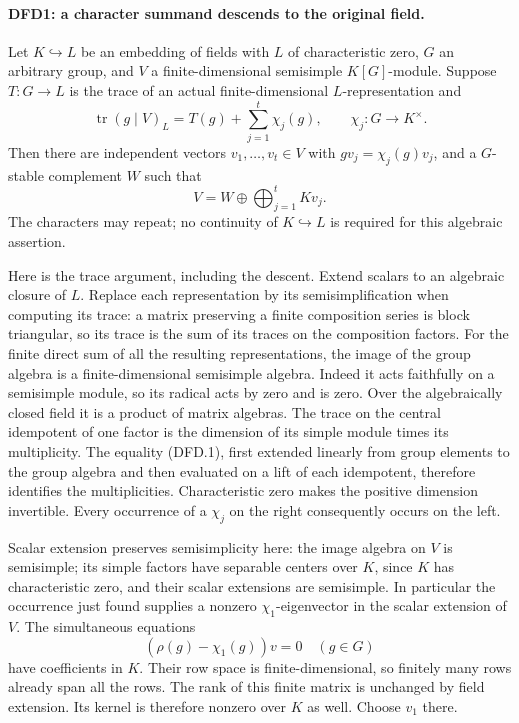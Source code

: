 \documentclass[11pt,a4paper]{article}
\numberwithin{equation}{section}
\theoremstyle{remark}\newtheorem{remark}[theorem]{Remark}
\begin{document}
\paragraph{DFD1: a character summand descends to the original field.}
\label{claim:DFD1}
Let $K\hookrightarrow L$ be an embedding of fields with $L$ of
characteristic zero, $G$ an arbitrary group, and $V$ a finite-dimensional
semisimple $K[G]$-module. Suppose $T:G\to L$ is the trace of an actual
finite-dimensional $L$-representation and
\[
 \operatorname{tr}(g\mid V)_L=T(g)+\sum_{j=1}^{t}\chi_j(g),
 \qquad \chi_j:G\longrightarrow K^\times.                 \tag{DFD.1}
\]
Then there are independent vectors $v_1,\ldots,v_t\in V$ with
$gv_j=\chi_j(g)v_j$, and a $G$-stable complement $W$ such that
\[
 V=W\oplus\bigoplus_{j=1}^{t}Kv_j.                       \tag{DFD.2}
\]
The characters may repeat; no continuity of $K\hookrightarrow L$ is
required for this algebraic assertion.

Here is the trace argument, including the descent. Extend scalars to
an algebraic closure of $L$. Replace each representation by its
semisimplification when computing its trace: a matrix preserving a
finite composition series is block triangular, so its trace is the
sum of its traces on the composition factors. For the finite direct
sum of all the resulting representations, the image of the group
algebra is a finite-dimensional semisimple algebra. Indeed it acts
faithfully on a semisimple module, so its radical acts by zero and
is zero. Over the algebraically closed field it is a product of
matrix algebras. The trace on the central idempotent of one factor
is the dimension of its simple module times its multiplicity.
The equality (DFD.1), first extended linearly from group elements to
the group algebra and then evaluated on a lift of each idempotent,
therefore identifies the multiplicities. Characteristic zero makes
the positive dimension invertible. Every occurrence of a $\chi_j$
on the right consequently occurs on the left.

Scalar extension preserves semisimplicity here: the image algebra
on $V$ is semisimple; its simple factors have separable centers over
$K$, since $K$ has characteristic zero, and their scalar extensions
are semisimple. In particular the occurrence just found supplies
a nonzero $\chi_1$-eigenvector in the scalar extension of $V$.
The simultaneous equations
\[
 (\rho(g)-\chi_1(g))v=0\quad(g\in G)
\]
have coefficients in $K$. Their row space is finite-dimensional,
so finitely many rows already span all the rows. The rank of this
finite matrix is unchanged by field extension. Its kernel is
therefore nonzero over $K$ as well. Choose $v_1$ there.
\end{document}

